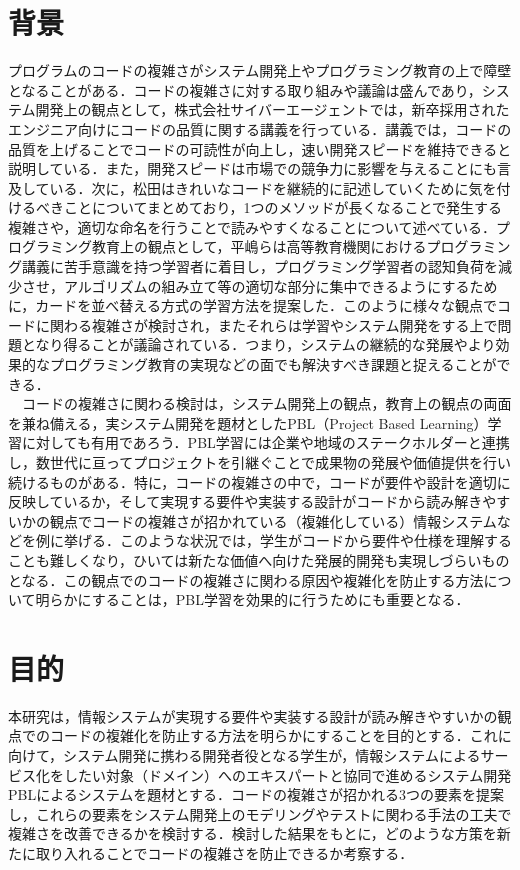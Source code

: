 \documentclass[12pt, a4paper]{jreport}
\begin{document}
    \section{背景}
    プログラムのコードの複雑さがシステム開発上やプログラミング教育の上で障壁となることがある．コードの複雑さに対する取り組みや議論は盛んであり，システム開発上の観点として，株式会社サイバーエージェント\cite{CyberZ}では，新卒採用されたエンジニア向けにコードの品質に関する講義を行っている．講義では，コードの品質を上げることでコードの可読性が向上し，速い開発スピードを維持できると説明している．また，開発スピードは市場での競争力に影響を与えることにも言及している．次に，松田\cite{kireina}はきれいなコードを継続的に記述していくために気を付けるべきことについてまとめており，1つのメソッドが長くなることで発生する複雑さや，適切な命名を行うことで読みやすくなることについて述べている．プログラミング教育上の観点として，平嶋ら\cite{haikei}は高等教育機関におけるプログラミング講義に苦手意識を持つ学習者に着目し，プログラミング学習者の認知負荷を減少させ，アルゴリズムの組み立て等の適切な部分に集中できるようにするために，カードを並べ替える方式の学習方法を提案した．このように様々な観点でコードに関わる複雑さが検討され，またそれらは学習やシステム開発をする上で問題となり得ることが議論されている．つまり，システムの継続的な発展やより効果的なプログラミング教育の実現などの面でも解決すべき課題と捉えることができる．
    \\　コードの複雑さに関わる検討は，システム開発上の観点，教育上の観点の両面を兼ね備える，実システム開発を題材としたPBL（Project Based Learning）学習に対しても有用であろう．PBL学習には企業や地域のステークホルダーと連携し，数世代に亘ってプロジェクトを引継ぐことで成果物の発展や価値提供を行い続けるものがある．特に，コードの複雑さの中で，コードが要件や設計を適切に反映しているか，そして実現する要件や実装する設計がコードから読み解きやすいかの観点でコードの複雑さが招かれている（複雑化している）情報システムなどを例に挙げる．このような状況では，学生がコードから要件や仕様を理解することも難しくなり，ひいては新たな価値へ向けた発展的開発も実現しづらいものとなる．この観点でのコードの複雑さに関わる原因や複雑化を防止する方法について明らかにすることは，PBL学習を効果的に行うためにも重要となる．
\section{目的}
本研究は，情報システムが実現する要件や実装する設計が読み解きやすいかの観点でのコードの複雑化を防止する方法を明らかにすることを目的とする．これに向けて，システム開発に携わる開発者役となる学生が，情報システムによるサービス化をしたい対象（ドメイン）へのエキスパートと協同で進めるシステム開発PBLによるシステムを題材とする．コードの複雑さが招かれる3つの要素を提案し，これらの要素をシステム開発上のモデリングやテストに関わる手法の工夫で複雑さを改善できるかを検討する．検討した結果をもとに，どのような方策を新たに取り入れることでコードの複雑さを防止できるか考察する．
\end{document}
